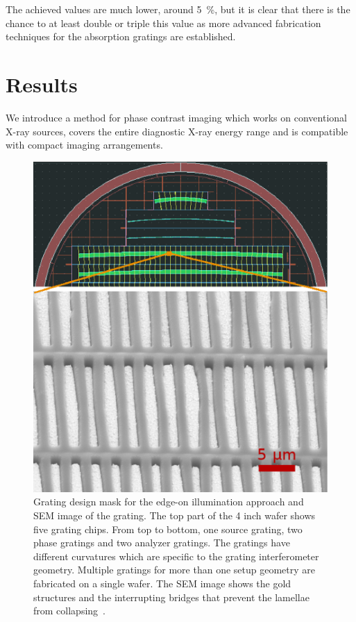 The achieved values are much lower, around \SI{5}{\percent}, but it is clear
that there is the chance to at least double or triple this value as more
advanced fabrication techniques for the absorption gratings are established.

\section{Results}
We introduce a method for phase contrast imaging which works on
conventional X-ray sources, covers the entire diagnostic X-ray energy range
and is compatible with compact imaging arrangements. 

\begin{figure}[h!]
    \centering
    \includegraphics[width=\textwidth]{gfx/grating_mask.eps}
    \caption{Grating design mask for
        the edge-on illumination approach and \ac{SEM}
        image of the grating. The top part of the 4 inch wafer shows
        five grating chips. From top to bottom, one source grating, two
        phase gratings and two analyzer gratings. The
        gratings have different curvatures which are specific to the grating
        interferometer geometry. Multiple gratings for more than one setup
        geometry are fabricated on a single wafer.
        The \ac{SEM} image shows the gold structures and the interrupting bridges
        that prevent the lamellae from collapsing~\parencite{Kenntner2010}.}\label{Fig:grating_mask}
\end{figure}


